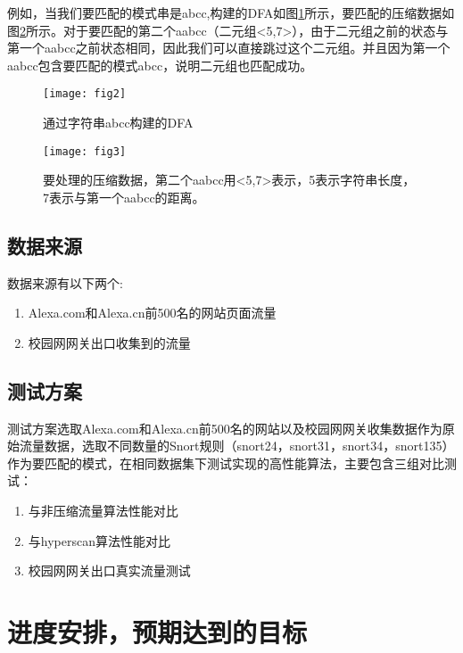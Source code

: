 例如，当我们要匹配的模式串是abcc,构建的DFA如图\ref{fig:fig2}所示，要匹配的压缩数据如图\ref{fig:fig3}所示。对于要匹配的第二个aabcc（二元组<5,7>），由于二元组之前的状态与第一个aabcc之前状态相同，因此我们可以直接跳过这个二元组。并且因为第一个aabcc包含要匹配的模式abcc，说明二元组也匹配成功。

\begin{figure}[h]
    \centering
    \texttt{[image: fig2]}
    \caption{通过字符串abcc构建的DFA}
    \label{fig:fig2}
\end{figure}

\begin{figure}[h]
    \centering
    \texttt{[image: fig3]}
    \caption{要处理的压缩数据，第二个aabcc用<5,7>表示，5表示字符串长度，7表示与第一个aabcc的距离。}
    \label{fig:fig3}
\end{figure}

\vspace{3mm}
\subsection{数据来源}
数据来源有以下两个:
\begin{enumerate}
  \item Alexa.com和Alexa.cn前500名的网站页面流量
  \item 校园网网关出口收集到的流量
\end{enumerate}

\vspace{3mm}
\subsection{测试方案}
测试方案选取Alexa.com和Alexa.cn前500名的网站以及校园网网关收集数据作为原始流量数据，选取不同数量的Snort规则（snort24，snort31，snort34，snort135）作为要匹配的模式，在相同数据集下测试实现的高性能算法，主要包含三组对比测试：
\begin{enumerate}
  \item 与非压缩流量算法性能对比
  \item 与hyperscan算法性能对比
  \item 校园网网关出口真实流量测试
\end{enumerate}

\vspace{8mm}
\section{进度安排，预期达到的目标}

